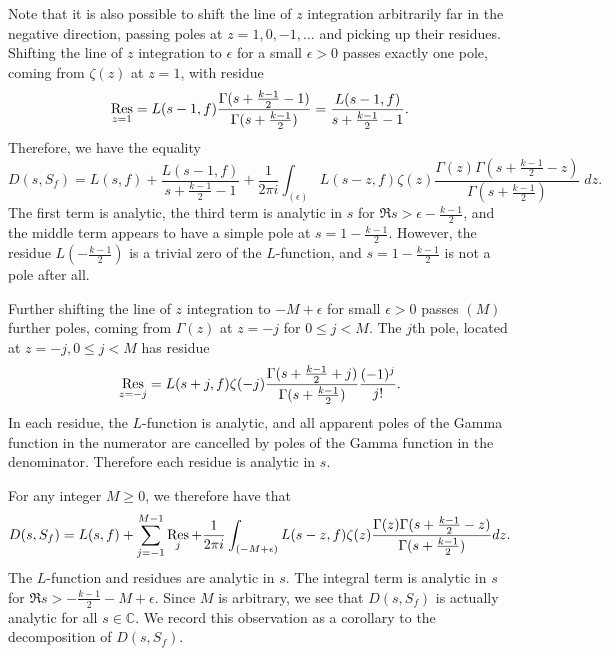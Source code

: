 Note that it is also possible to shift the line of $z$ integration arbitrarily far in the
negative direction, passing poles at $z = 1, 0, -1, \ldots$ and picking up their residues.
Shifting the line of $z$ integration to $\epsilon$ for a small $\epsilon > 0$ passes
exactly one pole, coming from $\zeta(z)$ at $z = 1$, with residue
\begin{equation}
  \operatorname*{Res}_{z = 1} = L(s - 1, f) \frac{\Gamma(s + \frac{k-1}{2} - 1)}{\Gamma(s +
  \frac{k-1}{2})} = \frac{L(s-1, f)}{s + \frac{k-1}{2} - 1}.
\end{equation}
Therefore, we have the equality
\begin{equation}
  D(s, S_f) = L(s, f) + \frac{L(s-1, f)}{s + \frac{k-1}{2} - 1} + \frac{1}{2\pi i}
  \int_{(\epsilon)} L(s - z, f) \zeta(z) \frac{\Gamma(z)\Gamma(s + \frac{k-1}{2} -
  z)}{\Gamma(s + \frac{k-1}{2})} \; dz.
\end{equation}
The first term is analytic, the third term is analytic in $s$ for $\Re s > \epsilon -
\frac{k-1}{2}$, and the middle term appears to have a simple pole at $s = 1 -
\frac{k-1}{2}$.
However, the residue $L(-\tfrac{k-1}{2})$ is a trivial zero of the $L$-function, and $s =
1 - \frac{k-1}{2}$ is not a pole after all.


Further shifting the line of $z$ integration to $-M + \epsilon$ for small $\epsilon > 0$
passes $(M)$ further poles, coming from $\Gamma(z)$ at $z = -j$ for $0 \leq j < M$.
The $j$th pole, located at $z = -j, 0 \leq j < M$ has residue
\begin{equation}
  \operatorname*{Res}_{z = -j} = L(s + j, f) \zeta(-j) \frac{\Gamma(s + \frac{k-1}{2} + j)}{\Gamma(s +
  \frac{k-1}{2})} \frac{(-1)^j}{j!}.
\end{equation}
In each residue, the $L$-function is analytic, and all apparent poles of the Gamma
function in the numerator are cancelled by poles of the Gamma function in the denominator.
Therefore each residue is analytic in $s$.


For any integer $M \geq 0$, we therefore have that
\begin{equation}
  D(s, S_f) = L(s, f) + \sum_{j = -1}^{M-1} \operatorname*{Res}_j + \frac{1}{2\pi i} \int_{(-M +
  \epsilon)} L(s - z, f)\zeta(z) \frac{\Gamma(z) \Gamma(s + \frac{k-1}{2} - z)}{\Gamma(s +
\frac{k-1}{2})} dz.
\end{equation}
The $L$-function and residues are analytic in $s$.
The integral term is analytic in $s$ for $\Re s > -\frac{k-1}{2} - M + \epsilon$.
Since $M$ is arbitrary, we see that $D(s, S_f)$ is actually analytic for all $s \in
\mathbb{C}$.
We record this observation as a corollary to the decomposition of $D(s, S_f)$.


